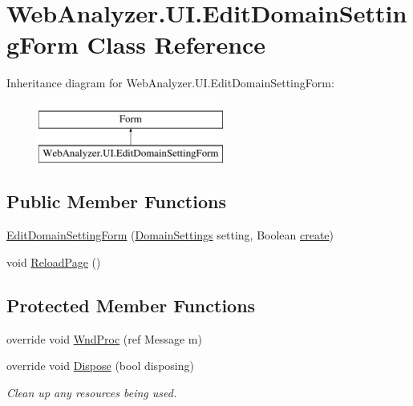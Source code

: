 \hypertarget{class_web_analyzer_1_1_u_i_1_1_edit_domain_setting_form}{}\section{Web\+Analyzer.\+U\+I.\+Edit\+Domain\+Setting\+Form Class Reference}
\label{class_web_analyzer_1_1_u_i_1_1_edit_domain_setting_form}
Inheritance diagram for Web\+Analyzer.\+U\+I.\+Edit\+Domain\+Setting\+Form\+:\begin{figure}[H]
\begin{center}
\leavevmode
\includegraphics[height=2.000000cm]{class_web_analyzer_1_1_u_i_1_1_edit_domain_setting_form}
\end{center}
\end{figure}
\subsection*{Public Member Functions}
\begin{DoxyCompactItemize}
\item 
\hyperlink{class_web_analyzer_1_1_u_i_1_1_edit_domain_setting_form_ac767a0df7b213a4871dd99c1d7d1d8a0}{Edit\+Domain\+Setting\+Form} (\hyperlink{class_web_analyzer_1_1_models_1_1_settings_model_1_1_domain_settings}{Domain\+Settings} setting, Boolean \hyperlink{_u_i_2_h_t_m_l_resources_2js_2lib_2underscore_8min_8js_a8bd5981157799459d39a59e8c4a0de04}{create})
\item 
void \hyperlink{class_web_analyzer_1_1_u_i_1_1_edit_domain_setting_form_afdf2612e1744f20b842785be8e901c01}{Reload\+Page} ()
\end{DoxyCompactItemize}
\subsection*{Protected Member Functions}
\begin{DoxyCompactItemize}
\item 
override void \hyperlink{class_web_analyzer_1_1_u_i_1_1_edit_domain_setting_form_ae7d7082d04e4b1b0ef23fd1f6eb9a5c4}{Wnd\+Proc} (ref Message m)
\item 
override void \hyperlink{class_web_analyzer_1_1_u_i_1_1_edit_domain_setting_form_a70d59a8078b0476fb0256f5e3f71cc39}{Dispose} (bool disposing)
\begin{DoxyCompactList}\small\item\em Clean up any resources being used. \end{DoxyCompactList}\end{DoxyCompactItemize}
